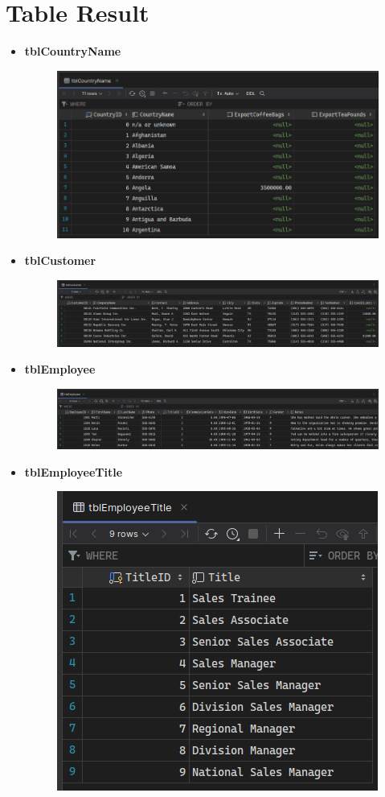 \documentclass[12pt,titlepage]{article}
\begin{document}
\pagebreak

\section{Table Result}
\begin{itemize}
    \item {
        \textbf{tblCountryName}
        \begin{figure}[h]
            \centering
            \includegraphics[width=.7\textwidth]{./images/tblCountryName.png}
        \end{figure}
    }
    \item {
        \textbf{tblCustomer}
        \begin{figure}[h]
            \centering
            \includegraphics[width=.7\textwidth]{./images/tblCustomer.png}
        \end{figure}
    }
    \item {
        \textbf{tblEmployee}
        \begin{figure}[h]
            \centering
            \includegraphics[width=.7\textwidth]{./images/tblEmployee.png}
        \end{figure}
    }
    \pagebreak
    \item {
        \textbf{tblEmployeeTitle}
        \begin{figure}[h]
            \centering
            \includegraphics[width=.7\textwidth]{./images/tblEmployeeTitle.png}

\end{figure}}
\end{itemize}
\end{document}
